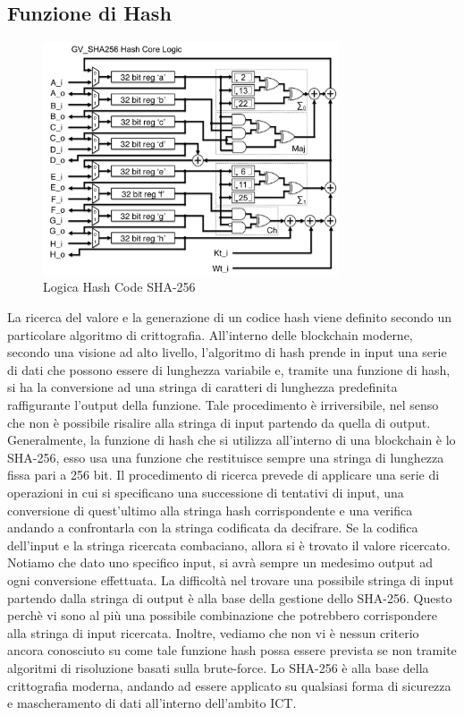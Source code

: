 \subsection{Funzione di Hash}
\begin{figure}[h]
    \centering
    \includegraphics[width=0.78\textwidth]{img/sha256.png}
    \caption{Logica Hash Code SHA-256}
    \label{fig:sha256}
\end{figure}
La ricerca del valore e la generazione di un codice hash viene definito secondo un particolare algoritmo di crittografia. All'interno delle blockchain moderne, secondo una visione ad alto livello, l'algoritmo di hash prende in input una serie di dati che possono essere di lunghezza variabile e, tramite una funzione di hash, si ha la conversione ad una stringa di caratteri di lunghezza predefinita raffigurante l'output della funzione. Tale procedimento è irriversibile, nel senso che non è possibile risalire alla stringa di input partendo da quella di output. Generalmente, la funzione di hash che si utilizza all'interno di una blockchain è lo SHA-256, esso usa una funzione che restituisce sempre una stringa di lunghezza fissa pari a 256 bit. Il procedimento di ricerca prevede di applicare una serie di operazioni in cui si specificano una successione di tentativi di input, una conversione di quest'ultimo alla stringa hash corrispondente e una verifica andando a confrontarla con la stringa codificata da decifrare. Se la codifica dell'input e la stringa ricercata combaciano, allora si è trovato il valore ricercato. Notiamo che dato uno specifico input, si avrà sempre un medesimo output ad ogni conversione effettuata. La difficoltà nel trovare una possibile stringa di input partendo dalla stringa di output è alla base della gestione dello SHA-256. Questo perchè vi sono al più una possibile combinazione che potrebbero corrispondere alla stringa di input ricercata. Inoltre, vediamo che non vi è nessun criterio ancora conosciuto su come tale funzione hash possa essere prevista se non tramite algoritmi di risoluzione basati sulla brute-force. Lo SHA-256 è alla base della crittografia moderna, andando ad essere applicato su qualsiasi forma di sicurezza e mascheramento di dati all'interno dell'ambito ICT. 
